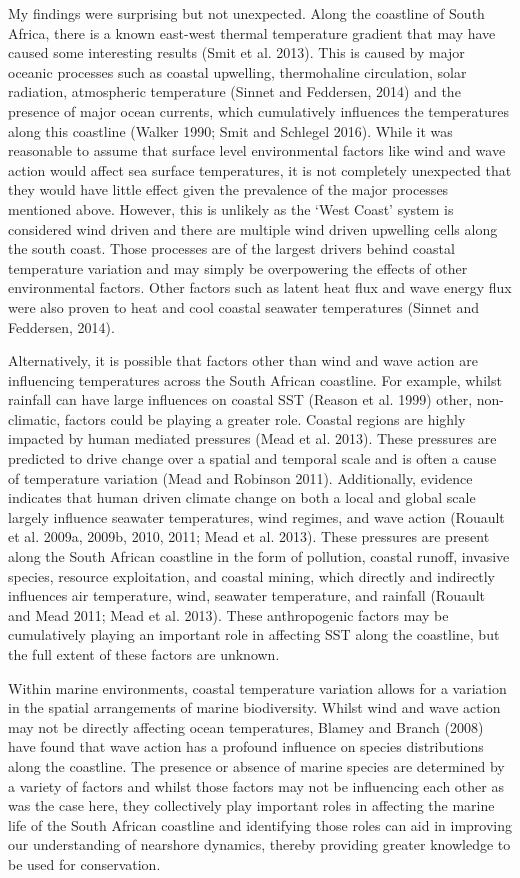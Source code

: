 \documentclass[12pt,A4paper,]{article}
\begin{document}
My findings were surprising but not unexpected. Along the coastline of
South Africa, there is a known east-west thermal temperature gradient
that may have caused some interesting results (Smit et al. 2013). This
is caused by major oceanic processes such as coastal upwelling,
thermohaline circulation, solar radiation, atmospheric temperature
(Sinnet and Feddersen, 2014) and the presence of major ocean currents,
which cumulatively influences the temperatures along this coastline
(Walker 1990; Smit and Schlegel 2016). While it was reasonable to assume
that surface level environmental factors like wind and wave action would
affect sea surface temperatures, it is not completely unexpected that
they would have little effect given the prevalence of the major
processes mentioned above. However, this is unlikely as the `West Coast'
system is considered wind driven and there are multiple wind driven
upwelling cells along the south coast. Those processes are of the
largest drivers behind coastal temperature variation and may simply be
overpowering the effects of other environmental factors. Other factors
such as latent heat flux and wave energy flux were also proven to heat
and cool coastal seawater temperatures (Sinnet and Feddersen, 2014).

Alternatively, it is possible that factors other than wind and wave
action are influencing temperatures across the South African coastline.
For example, whilst rainfall can have large influences on coastal SST
(Reason et al. 1999) other, non-climatic, factors could be playing a
greater role. Coastal regions are highly impacted by human mediated
pressures (Mead et al. 2013). These pressures are predicted to drive
change over a spatial and temporal scale and is often a cause of
temperature variation (Mead and Robinson 2011). Additionally, evidence
indicates that human driven climate change on both a local and global
scale largely influence seawater temperatures, wind regimes, and wave
action (Rouault et al. 2009a, 2009b, 2010, 2011; Mead et al. 2013).
These pressures are present along the South African coastline in the
form of pollution, coastal runoff, invasive species, resource
exploitation, and coastal mining, which directly and indirectly
influences air temperature, wind, seawater temperature, and rainfall
(Rouault and Mead 2011; Mead et al. 2013). These anthropogenic factors
may be cumulatively playing an important role in affecting SST along the
coastline, but the full extent of these factors are unknown.

Within marine environments, coastal temperature variation allows for a
variation in the spatial arrangements of marine biodiversity. Whilst
wind and wave action may not be directly affecting ocean temperatures,
Blamey and Branch (2008) have found that wave action has a profound
influence on species distributions along the coastline. The presence or
absence of marine species are determined by a variety of factors and
whilst those factors may not be influencing each other as was the case
here, they collectively play important roles in affecting the marine
life of the South African coastline and identifying those roles can aid
in improving our understanding of nearshore dynamics, thereby providing
greater knowledge to be used for conservation.
\end{document}
